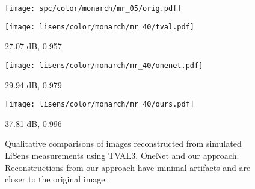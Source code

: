 \documentclass[journal,twoside]{IEEEtran}
\begin{document}
\begin{figure*}[t]
\begin{minipage}{.98\textwidth}
\begin{minipage}{.20\textwidth}
\vspace{-0.35cm}
\texttt{[image: spc/color/monarch/mr\_05/orig.pdf]}  
\end{minipage}\hspace{0.1cm}
\begin{minipage}{.20\textwidth}
\vspace{0.1cm}
\texttt{[image: lisens/color/monarch/mr\_40/tval.pdf]}  
\centerline{ 27.07 dB, 0.957}
\end{minipage}\hspace{0.1cm}
\begin{minipage}{.20\textwidth}
\vspace{0.1cm}
\texttt{[image: lisens/color/monarch/mr\_40/onenet.pdf]}  
\centerline{ 29.94 dB, 0.979}
\end{minipage}\hspace{0.1cm}
\begin{minipage}{.20\textwidth}
\vspace{0.1cm}
\texttt{[image: lisens/color/monarch/mr\_40/ours.pdf]}  
\centerline{ 37.81 dB, 0.996}
\end{minipage}
\end{minipage}
\caption{ Qualitative comparisons of images reconstructed from simulated LiSens measurements using TVAL3, OneNet and our approach. Reconstructions from our approach have minimal artifacts and are closer to the original image. }
\label{fig:lisens_color}
\end{figure*}

\ifCLASSOPTIONcaptionsoff
  \newpage
\fi




%
%
%


\end{document}
